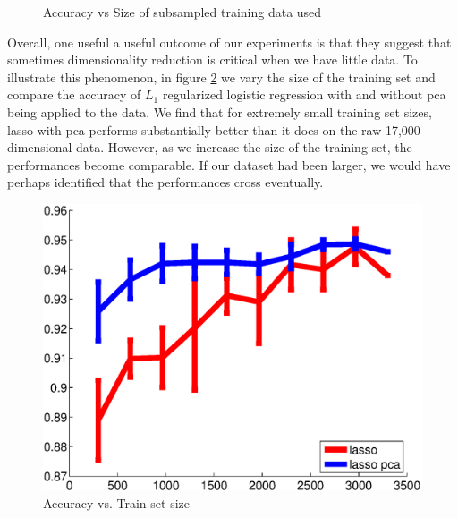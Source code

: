 \begin{center}
\begin{figure}[!ht]
\centering
{}
\caption{Accuracy vs Size of subsampled training data used}
\label{fig:largecompareAcc}
\par
\end{figure}
\end{center}


Overall, one useful a useful outcome of our experiments is that they suggest that sometimes dimensionality reduction is critical when we have little data. To illustrate this phenomenon, in figure \ref{fig:lassoCompare} we vary the size of the training set and compare the accuracy of  $L_1$ regularized logistic regression with and without pca being applied to the data. We find that for extremely small training set sizes, lasso with pca performs substantially better than it does on the raw 17,000 dimensional data. However, as we increase the size of the training set, the performances become comparable. If our dataset had been larger, we would have perhaps identified that the performances cross eventually. 

\begin{center}
\begin{figure}[!ht]
\centering
\includegraphics[width=.5\textwidth]{../images/_lasso_lasso_pca_acc.eps}
\caption{Accuracy vs. Train set size}
\par
\label{fig:lassoCompare}
\end{figure}
\end{center}

